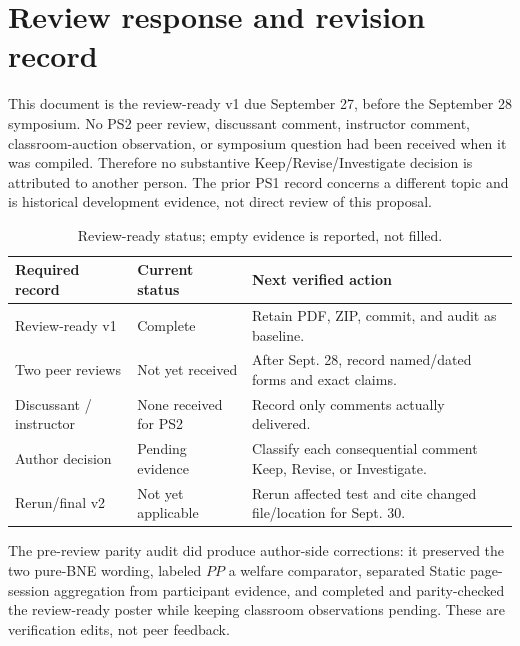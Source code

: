\newpage
\section{Review response and revision record}
\label{app:review}
This document is the review-ready v1 due September 27, before the September 28 symposium. No PS2 peer review, discussant comment, instructor comment, classroom-auction observation, or symposium question had been received when it was compiled. Therefore no substantive Keep/Revise/Investigate decision is attributed to another person. The prior PS1 record concerns a different topic and is historical development evidence, not direct review of this proposal.

\begin{table}[h]
\caption{Review-ready status; empty evidence is reported, not filled.}
\footnotesize
\begin{tabularx}{\columnwidth}{@{}p{1.55cm}p{1.55cm}Y@{}}\toprule
\textbf{Required record}&\textbf{Current status}&\textbf{Next verified action}\\\midrule
Review-ready v1&Complete&Retain PDF, ZIP, commit, and audit as baseline.\\
Two peer reviews&Not yet received&After Sept. 28, record named/dated forms and exact claims.\\
Discussant / instructor&None received for PS2&Record only comments actually delivered.\\
Author decision&Pending evidence&Classify each consequential comment Keep, Revise, or Investigate.\\
Rerun/final v2&Not yet applicable&Rerun affected test and cite changed file/location for Sept. 30.\\\bottomrule
\end{tabularx}
\end{table}

The pre-review parity audit did produce author-side corrections: it preserved the two pure-BNE wording, labeled $PP$ a welfare comparator, separated Static page-session aggregation from participant evidence, and completed and parity-checked the review-ready poster while keeping classroom observations pending. These are verification edits, not peer feedback.

\clearpage\onecolumn
